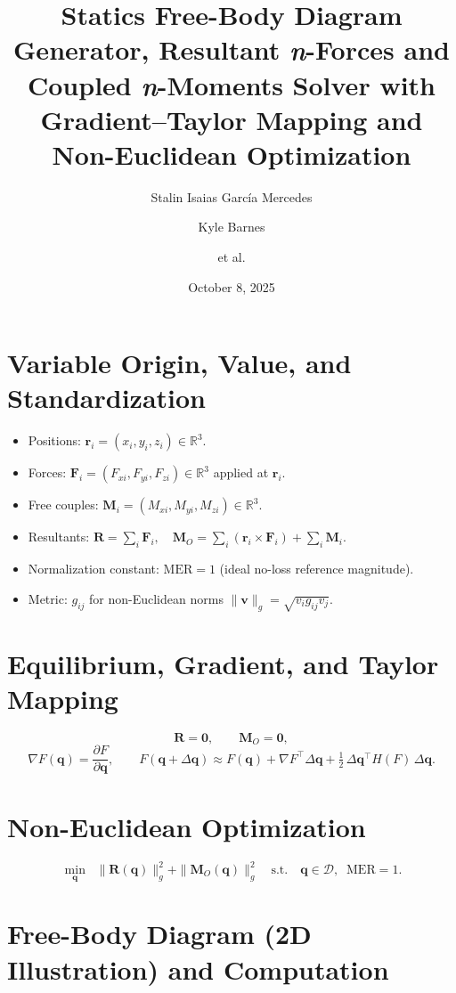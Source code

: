 \documentclass[12pt]{article}
\title{\textbf{Statics Free-Body Diagram Generator, Resultant \emph{n}-Forces and Coupled \emph{n}-Moments Solver with Gradient--Taylor Mapping and Non-Euclidean Optimization}}
\author{Stalin Isaias Garc\'ia Mercedes \and Kyle Barnes \and et al.}
\date{October 8, 2025}
\newcommand{\MER}{1}
\newcommand{\GradF}{\nabla F}
\newcommand{\TaylorF}[1]{%
F(\mathbf{q}+\Delta\mathbf{q})\approx F(\mathbf{q})+\GradF^\top\Delta\mathbf{q}+\tfrac12\,\Delta\mathbf{q}^\top H(F)\,\Delta\mathbf{q}%
}
\begin{document}
\maketitle

\section*{Variable Origin, Value, and Standardization}
\begin{itemize}
\item Positions: \( \mathbf{r}_i=(x_i,y_i,z_i)\in\mathbb{R}^3 \).
\item Forces: \( \mathbf{F}_i=(F_{xi},F_{yi},F_{zi})\in\mathbb{R}^3 \) applied at \( \mathbf{r}_i \).
\item Free couples: \( \mathbf{M}_i=(M_{xi},M_{yi},M_{zi})\in\mathbb{R}^3 \).
\item Resultants: \( \mathbf{R}=\sum_i \mathbf{F}_i,\quad \mathbf{M}_O=\sum_i(\mathbf{r}_i\times \mathbf{F}_i)+\sum_i \mathbf{M}_i \).
\item Normalization constant: \( \mathrm{MER}=\MER \) (ideal no-loss reference magnitude).
\item Metric: \( g_{ij} \) for non-Euclidean norms \( \|\mathbf{v}\|_g=\sqrt{v_i g_{ij} v_j} \).
\end{itemize}

\section*{Equilibrium, Gradient, and Taylor Mapping}
\[
\mathbf{R}=\mathbf{0},\qquad \mathbf{M}_O=\mathbf{0},
\]
\[
\GradF(\mathbf{q})=\frac{\partial F}{\partial \mathbf{q}},\qquad
\TaylorF{\mathbf{q}}.
\]

\section*{Non-Euclidean Optimization}
\[
\min_{\mathbf{q}} \;\; \|\mathbf{R}(\mathbf{q})\|_g^2+\|\mathbf{M}_O(\mathbf{q})\|_g^2
\quad\text{s.t.}\quad \mathbf{q}\in\mathcal{D},\;\; \mathrm{MER}=\MER.
\]

\section*{Free-Body Diagram (2D Illustration) and Computation}
\begin{center}
\end{center}
\end{document}
